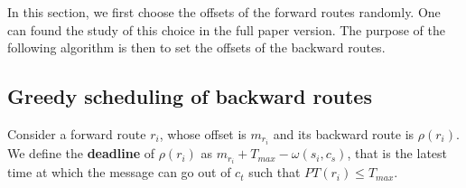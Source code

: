 \documentclass[10pt, conference, letterpaper]{IEEEtran}
\newcommand{\todo}[1]{{\color{red} TODO: {#1}}}
\newcommand\pall{\textsc{pall}\xspace}
\newcommand\bra{\textsc{bra}\xspace}
\begin{document}
%
%	
   
   In this section, we first choose the offsets of the forward routes randomly. One can found the study of this choice in the full paper version. The purpose of the following algorithm is then to set the offsets of the backward routes.
   \subsection{Greedy scheduling of backward routes}
    
    Consider a forward route $r_i$, whose offset is $m_{r_i}$ and its backward route is $\rho(r_i)$.
    We define the {\bf deadline} of $\rho(r_i)$ as $m_{r_i} + T_{max} - \omega(s_i,c_s)$, that is the latest time at which the message can go out of $c_t$ such that $PT(r_i) \leq T_{max}$.
\end{document}
